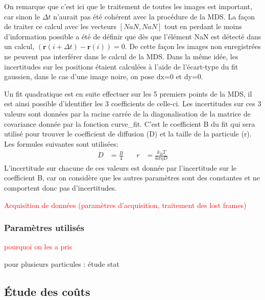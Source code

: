 \documentclass[11pt,letterpaper]{article}
\begin{document}
On remarque que c'est ici que le traitement de toutes les images est important, car sinon le $\Delta t$ n'aurait pas été cohérent avec la procédure de la MDS. 
La façon de traiter ce calcul avec les vecteurs $\left [ NaN ,NaN \right ]$ tout en perdant le moins d'information possible a été de définir que 
dès que l’élément NaN est détecté dans un calcul, $\left( \mathbf{r}(i+\Delta t) - \mathbf{r}(i) \right)=0$. De cette façon les images non enregistrées
ne peuvent pas interférer dans le calcul de la MDS. Dans la même idée, les incertitudes sur les positions    étaient calculées à l'aide de l'écart-type 
du fit gaussien, dans le cas d'une image noire, on pose dx=0 et dy=0. 

Un fit quadratique est en suite effectuer sur les 5 premiers points de la MDS, il est ainsi possible d'identifier les 3 coefficients de celle-ci.
Les incertitudes sur ces 3 valeurs sont données par la racine carrée de la diagonalisation de la matrice de covariance donnée par la fonction curve\_fit. 
C'est le coefficient B du fit qui sera utilisé pour trouver le coefficient de diffusion (D) et la taille de la particule (r). Les formules suivantes sont utilisées: 
\begin{align*}
  D &= \frac{B}{4} \quad & r &= \frac{k_B T}{6 \pi \eta D}
\end{align*}
L'incertitude sur chacune de ces valeurs est donnée par l'incertitude sur le coefficient B, car on considère que les autres paramètres sont des constantes
et ne comportent donc pas d'incertitudes. 

\textcolor{red}{Acquisition de données (paramètres d'acquisition, traitement des lost frames)}

\textcolor{red}{}

\subsubsection{Paramètres utilisés}

\textcolor{red}{pourquoi on les a pris}




pour plusieurs particules : étude stat


\subsection{Étude des coûts}





% 
% 
\end{document}

